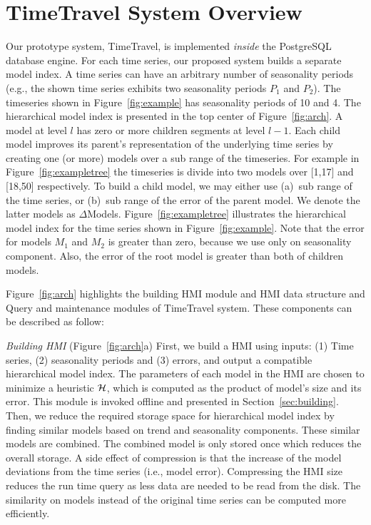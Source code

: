 \documentclass[10pt,conference,letterpaper]{IEEEtran}
\newcommand{\LN}{hierarchical model index}
\newcommand{\LNs}{hierarchical model index }
\begin{document}
\section{TimeTravel System Overview}
\label{sec:overview}
Our prototype system, TimeTravel, is implemented {\em inside} the PostgreSQL database engine. For each time series, our proposed system builds a separate model index.  A time series can have an arbitrary number of seasonality periods (e.g., the shown time series exhibits two seasonality periods $P_1$ and $P_2$). The timeseries shown in Figure~\ref{fig:example} has seasonality periods of 10 and 4. The \LNs is presented in the top center of Figure~\ref{fig:arch}. A model  at level $l$ has zero or more children segments at level $l-1$.  Each child model improves its parent's representation of the underlying time series by creating one (or more)  models over a sub range of the timeseries. For example in Figure~\ref{fig:exampletree} the timeseries is divide into two models over [1,17] and [18,50] respectively. To build a child model, we may either use  (a)~sub range of the time series, or (b)~sub range of the error of the parent model. We denote the latter models as $\Delta$Models. 
Figure~\ref{fig:exampletree} illustrates the hierarchical model index for the time series shown in Figure~\ref{fig:example}. Note that the error for models $M_1$ and $M_2$ is greater than zero, because we use only on seasonality component. Also, the error of the root model is greater than both of children models.

Figure~\ref{fig:arch} highlights the building HMI module and HMI data structure and Query and maintenance modules of TimeTravel system. These components can be described as follow:

{\em Building HMI} (Figure~\ref{fig:arch}a) First, we  build a HMI  using inputs: (1) Time series, (2)  seasonality periods and (3) errors, and output a compatible \LN.  
The parameters of each model in the HMI are chosen to minimize a heuristic $\cal H$, which is computed as  the product of model's size and its error. This module is invoked offline and presented in Section~\ref{sec:building}.
Then, we reduce the required storage space for \LNs by finding similar models  based on trend and seasonality components. These similar models are combined. The combined model is only stored once which reduces the overall storage. A side effect of  compression is that the increase of the model deviations from the time series (i.e., model error). Compressing the HMI size reduces the run time query as less data are needed to be read from the disk.
The similarity on models instead of the original time series can be computed more efficiently. 
\end{document}
